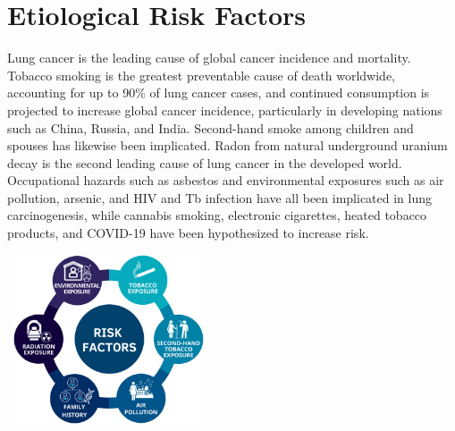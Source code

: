 
\section{Etiological Risk Factors}

Lung cancer is the leading cause of global cancer incidence and mortality. Tobacco smoking is the 
greatest preventable cause of death worldwide, accounting for up to 90\% of lung cancer cases, and 
continued consumption is projected to increase global cancer incidence, particularly in developing 
nations such as China, Russia, and India. Second-hand smoke among children and spouses has likewise 
been implicated. Radon from natural underground uranium decay is the second leading cause of lung 
cancer in the developed world. Occupational hazards such as asbestos and environmental exposures 
such as air pollution, arsenic, and HIV and Tb infection have all been implicated in lung 
carcinogenesis, while cannabis smoking, electronic cigarettes, heated tobacco products, and COVID-19 
have been hypothesized to increase risk.\cite{PMC8063897}

\begin{center} 
    \includegraphics[width = 6cm, height = 5cm]{../assets/02-etiology/risk-factors-lunf-cancer.jpg}
\end{center}



